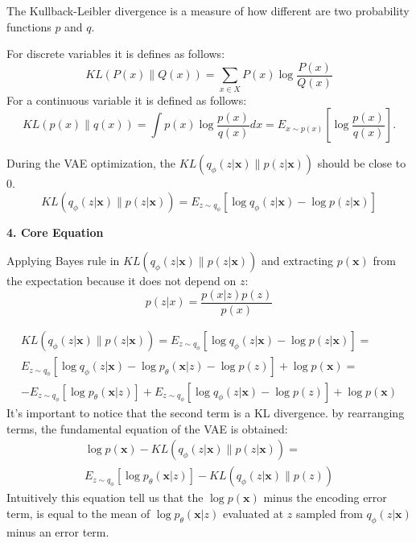 \documentclass[5p,sort&compress]{elsarticle}
\begin{document}
The Kullback-Leibler divergence is a measure of how different are two probability functions $p$ and $q$.

For discrete variables it is defines as follows:
\begin{equation}
K L(P(x) \| Q(x))=\sum_{x \in X} P(x) \log \frac{P(x)}{Q(x)}
\end{equation}
For a continuous variable it is defined as follows:
\begin{equation}
KL(p(x) \| q(x))=\int p(x) \log \frac{p(x)}{q(x)} d x=E_{x \sim p(x)}[\log \frac{p(x)}{q(x)}].
\end{equation}

During the VAE optimization, the $K L\left(q_{\phi}(z | \boldsymbol{x}) \| p(z | \boldsymbol{x})\right)$ should be close to 0.
\begin{equation}
K L\left(q_{\phi}(z | \boldsymbol{x}) \| p(z | \boldsymbol{x})\right)=E_{z \sim q_{\phi}}\left[\log q_{\phi}(z | \boldsymbol{x})-\log p(z | \boldsymbol{x})\right]
\end{equation}

\textbf{4. Core Equation}

Applying Bayes rule in $K L\left(q_{\phi}(z | \boldsymbol{x}) \| p(z | \boldsymbol{x})\right)$ and extracting $p(\boldsymbol{x})$ from the expectation because it does not depend on $z$:
\begin{equation}
p(z | x)=\frac{p(x | z) p(z)}{p(x)}
\end{equation}

\begin{equation}
\begin{aligned}
K L\left(q_{\phi}(z | \boldsymbol{x}) \| p(z | \boldsymbol{x})\right)=E_{z \sim q_{\phi}}\left[\log q_{\phi}(z | \boldsymbol{x})-\log p(z | \boldsymbol{x})\right] = \\
E_{z \sim q_{\phi}}\left[\log q_{\phi}(z | \boldsymbol{x})-\log p_{\theta}( \boldsymbol{x} | z) - \log p(z)\right] + \log p(\boldsymbol{x}) =\\
- E_{z \sim q_{\phi}}\left[\log p_{\theta}( \boldsymbol{x} | z)\right] + E_{z \sim q_{\phi}}\left[\log q_{\phi}(z | \boldsymbol{x}) - \log p(z)\right] + \log p(\boldsymbol{x})
\end{aligned}
\end{equation}
It's important to notice that the second term is a KL divergence.  by rearranging terms, the fundamental equation of the VAE is obtained:
\begin{equation}
\begin{aligned}
\log p(\boldsymbol{x})-K L\left(q_{\phi}(z | \boldsymbol{x}) \| p(z | \boldsymbol{x})\right)= \\
E_{z \sim q_{\phi}}\left[\log p_{\theta}(\boldsymbol{x} | z)\right]-K L\left(q_{\phi}(z | \boldsymbol{x}) \| p(z)\right)
\end{aligned}
\end{equation}
Intuitively this equation tell us that the $\log p(\boldsymbol{x})$ minus the encoding error term, is equal to the mean of $\log p_{\theta}(\boldsymbol{x} | z)$ evaluated at $z$ sampled from $q_{\phi}(z|\boldsymbol{x})$ minus an error term.
\end{document}
